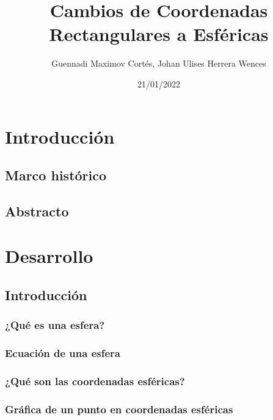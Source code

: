 \documentclass[letterpaper,14pt]{extreport} %
\title{Cambios de Coordenadas Rectangulares a Esféricas} %
\author{Guennadi Maximov Cortés, Johan Ulises Herrera Wences}
\date{21/01/2022} %
\begin{document}
  \maketitle
  \tableofcontents
  \newpage

  \chapter{Introducción}
      
    \section{Marco histórico}
      

    \section{Abstracto}
      

  \chapter{Desarrollo}
    \renewcommand{\chaptername}{Jornada}
    

    \section{Introducción}
      \subsection{¿Qué es una esfera?}
          

      \subsection{Ecuación de una esfera}
          

      \subsection{¿Qué son las coordenadas esféricas?}
          

      \subsection{Gráfica de un punto en coordenadas esféricas}
          
\end{document}
